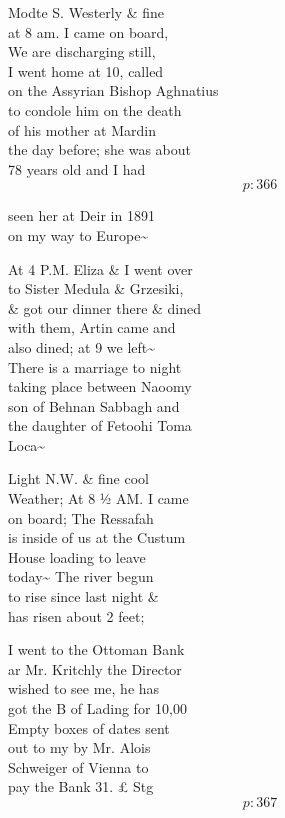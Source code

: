 \documentclass{report}
\begin{document}
	\par{
 	Modte S. Westerly \& fine\ \\at 8 am. I came on board,\ \\We are discharging still,\ \\I went home at 10, called\ \\on the Assyrian Bishop Aghnatius\ \\to condole him on the death\ \\of his mother at Mardin\ \\the day before; she was about\ \\78 years old and I had\ \\
  \[p: 366 \]

	}


	\par{
 	seen her at Deir in 1891\ \\on my way to Europe\~{}\ \\
	}

	\par{
 	At 4 P.M. Eliza \& I went over\ \\to Sister Medula \& Grzesiki,\ \\\& got our dinner there \& dined\ \\with them, Artin came and\ \\also dined; at 9 we left\~{}\ \\There is a marriage to night\ \\taking place between Naoomy\ \\son of Behnan Sabbagh and\ \\the daughter of Fetoohi Toma\ \\Loca\~{}\ \\
	}

	\par{
 	Light N.W. \& fine cool\ \\Weather; At 8 ½ AM. I came\ \\on board; The Ressafah\ \\is inside of us at the Custum\ \\House loading to leave\ \\today\~{} The river begun\ \\to rise since last night \&\ \\has risen about 2 feet;\ \\
	}

	\par{
 	I went to the Ottoman Bank\ \\ar Mr. Kritchly the Director\ \\wished to see me, he has\ \\got the B of Lading for 10,00\ \\Empty boxes of dates sent\ \\out to my by Mr. Alois\ \\Schweiger of Vienna to\ \\pay the Bank 31. £ Stg\ \\
  \[p: 367 \]

	}
\end{document}
